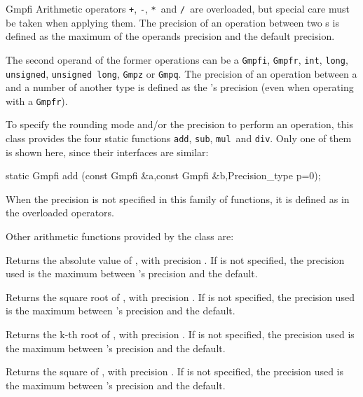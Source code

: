 \begin{ccRefClass} {Gmpfi}
Arithmetic operators \verb=+=, \verb=-=, \verb=*=\ and \verb=/=\ are
overloaded, but special care must be taken when applying them. The
precision of an operation between two s is defined as
the maximum of the operands precision and the default precision.

The second operand of the former operations can be a \verb=Gmpfi=,
\verb=Gmpfr=, \verb=int=, \verb=long=, \verb=unsigned=,
\verb=unsigned long=, \verb=Gmpz= or \verb=Gmpq=. The precision of an
operation between a  and a number of another type is defined
as the 's precision (even when operating with a \verb=Gmpfr=).

To specify the rounding mode and/or the precision to perform an operation,
this class provides the four static functions \verb=add=, \verb=sub=,
\verb=mul=~and \verb=div=. Only one of them is shown here, since their
interfaces are similar:

\ccFunction
        {static Gmpfi add (const Gmpfi &a,const Gmpfi &b,Precision_type p=0);}
        {}

When the precision is not specified in this family of functions, it is
defined as in the overloaded operators.



Other arithmetic functions provided by the class are:

        {Returns the absolute value of \ccVar, with precision .
	If  is not specified, the precision used is the maximum
	between \ccVar 's precision and the default.}

        {Returns the square root of \ccVar, with precision .
	If  is not specified, the precision used is the maximum
	between \ccVar 's precision and the default.}

        {Returns the k-th root of \ccVar, with precision .
	If  is not specified, the precision used is the maximum
	between \ccVar 's precision and the default.}

        {Returns the square of \ccVar, with precision . If
	 is not specified, the precision used is the maximum
	between \ccVar 's precision and the default.}




\end{ccRefClass}
